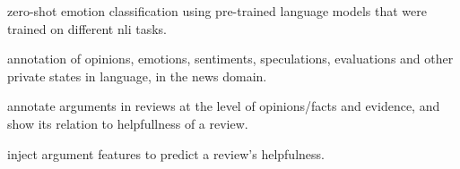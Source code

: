 \citep{Tesfagergish2022zeroshot_classification} zero-shot emotion classification using pre-trained language models that were trained on different nli tasks.

\citep{wiebe2005opinionAnnotation} annotation of opinions, emotions, sentiments, speculations, evaluations and other private states in language, in the news domain.

\citep{chen2022argumentMiningForHelpfulness} annotate arguments in reviews at the level of opinions/facts and evidence, and show its relation to helpfullness of a review.

\citep{liu2017argsForHelpfullness} inject argument features to predict a review's helpfulness.